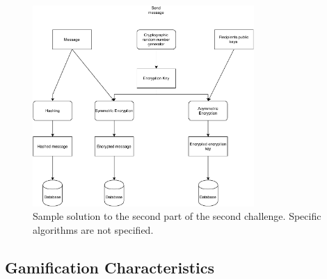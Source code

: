 \documentclass{l4proj}
\begin{document}
\begin{figure}[]
    \centering
    \includegraphics[width=0.75\textwidth, frame]{images/Questline2Part2Cropped.pdf}
    \caption{Sample solution to the second part of the second challenge.
    Specific algorithms are not specified.}
    \label{fig:Challenge2}
\end{figure}

\subsection{Gamification Characteristics}
\end{document}

